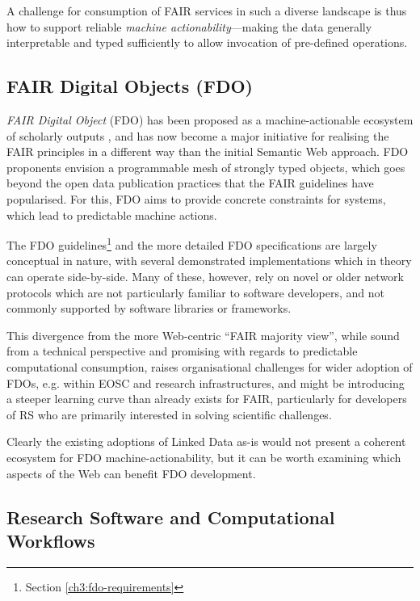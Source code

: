 A challenge for consumption of FAIR services in such a diverse landscape is thus how to support reliable \emph{machine actionability}---making the data generally interpretable and typed sufficiently to allow invocation of pre-defined operations.


\subsection{FAIR Digital Objects (FDO)}

\emph{FAIR Digital Object} (\acrshort{FDO}) has been proposed as a machine-actionable ecosystem of scholarly outputs \cite{Schultes 2019}, and has now become a major initiative for realising the \acrshort{FAIR} principles in a different way than the initial Semantic Web approach.
FDO proponents envision a programmable mesh of strongly typed objects, which goes beyond the open data publication practices that the FAIR guidelines have popularised.
For this, FDO aims to provide concrete constraints for systems, which lead to predictable machine actions.

The FDO guidelines\footnote{Section \vref{ch3:fdo-requirements}} \cite{Anders 2023} and the more detailed FDO specifications \cite{Ivonne 2023} are largely conceptual in nature, with several demonstrated implementations \cite{Wittenburg 2022a,Lannom 2022a} which in theory can operate side-by-side.
Many of these, however, rely on novel or older network protocols \cite{Reilly 2009,Sun 2003a} which are not particularly familiar to software developers, and not commonly supported by software libraries or frameworks.

This divergence from the more Web-centric ``FAIR majority view'', while sound from a technical perspective and promising with regards to predictable computational consumption, raises organisational challenges for wider adoption of FDOs, e.g. within EOSC and research infrastructures, and might be introducing a steeper learning curve than already exists for FAIR, particularly for developers of \acrlong{RS} who are primarily interested in solving scientific challenges. 

Clearly the existing adoptions of Linked Data as-is would not present a coherent ecosystem for FDO machine-actionability, but it can be worth examining which aspects of the Web can benefit FDO development.


\subsection{Research Software and Computational Workflows}

